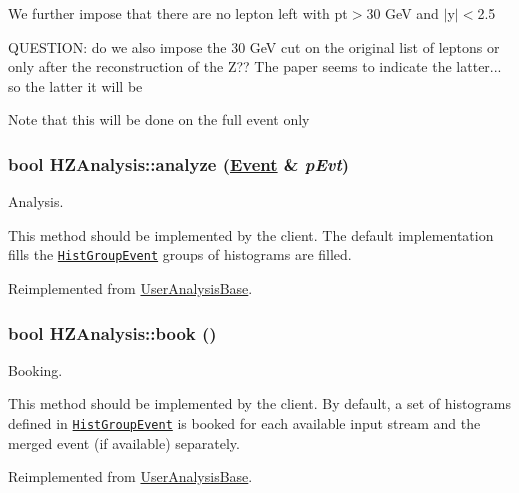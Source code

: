 We further impose that there are no lepton left with pt$>$30 Ge\-V and $|$y$|$$<$2.5

QUESTION: do we also impose the 30 Ge\-V cut on the original list of leptons or only after the reconstruction of the Z?? The paper seems to indicate the latter... so the latter it will be

Note that this will be done on the full event only \hypertarget{classHZAnalysis_9ff7e307f88b5a063fc047b38814c36c}{
\subsubsection[analyze]{\setlength{\rightskip}{0pt plus 5cm}bool HZAnalysis::analyze (\hyperlink{classEvent}{Event} \& {\em p\-Evt})}}
\label{classHZAnalysis_9ff7e307f88b5a063fc047b38814c36c}


Analysis. 

This method should be implemented by the client. The default implementation fills the {\tt \hyperlink{classHistGroupEvent}{Hist\-Group\-Event}} groups of histograms are filled. 

Reimplemented from \hyperlink{classUserAnalysisBase_015733b03dfc2596dfaf1841ca60a0b8}{User\-Analysis\-Base}.\hypertarget{classHZAnalysis_b2b6a462ad983ce4b847c7c010df6ec8}{
\subsubsection[book]{\setlength{\rightskip}{0pt plus 5cm}bool HZAnalysis::book ()}}
\label{classHZAnalysis_b2b6a462ad983ce4b847c7c010df6ec8}


Booking. 

This method should be implemented by the client. By default, a set of histograms defined in {\tt \hyperlink{classHistGroupEvent}{Hist\-Group\-Event}} is booked for each available input stream and the merged event (if available) separately. 

Reimplemented from \hyperlink{classUserAnalysisBase_4ed3754992929a1aeb1e938b31ec22af}{User\-Analysis\-Base}.

